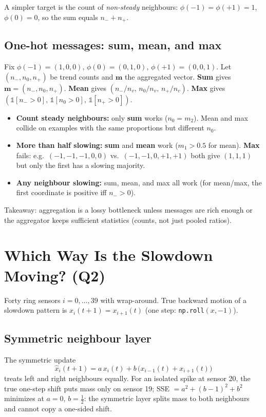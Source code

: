 A simpler target is the count of \emph{non-steady} neighbours: $\phi(-1)=\phi(+1)=1$, $\phi(0)=0$, so the sum equals $n_- + n_+$.

\subsection{One-hot messages: sum, mean, and max}

Fix $\phi(-1)=(1,0,0)$, $\phi(0)=(0,1,0)$, $\phi(+1)=(0,0,1)$.
Let $(n_-, n_0, n_+)$ be trend counts and $\mathbf{m}$ the aggregated vector.
\textbf{Sum} gives $\mathbf{m} = (n_-, n_0, n_+)$.
\textbf{Mean} gives $(n_-/n_v,\, n_0/n_v,\, n_+/n_v)$.
\textbf{Max} gives $(\mathbb{1}[n_->0],\,\mathbb{1}[n_0>0],\,\mathbb{1}[n_+>0])$.

\begin{itemize}
  \item \textbf{Count steady neighbours:} only \textbf{sum} works ($n_0 = m_2$). Mean and max collide on examples with the same proportions but different $n_0$.
  \item \textbf{More than half slowing:} \textbf{sum} and \textbf{mean} work ($m_1>0.5$ for mean). \textbf{Max} fails: e.g.\ $(-1,-1,-1,0,0)$ vs.\ $(-1,-1,0,+1,+1)$ both give $(1,1,1)$ but only the first has a slowing majority.
  \item \textbf{Any neighbour slowing:} sum, mean, and max all work (for mean/max, the first coordinate is positive iff $n_->0$).
\end{itemize}

Takeaway: aggregation is a lossy bottleneck unless messages are rich enough or the aggregator keeps sufficient statistics (counts, not just pooled ratios).

\section{Which Way Is the Slowdown Moving? (Q2)}

Forty ring sensors $i = 0,\ldots,39$ with wrap-around.
True backward motion of a slowdown pattern is $x_i(t+1) = x_{i+1}(t)$ (one step: \texttt{np.roll}$(x,-1)$).

\subsection{Symmetric neighbour layer}

The symmetric update
\[
  \hat{x}_i(t+1) = a\, x_i(t) + b\,\big(x_{i-1}(t) + x_{i+1}(t)\big)
\]
treats left and right neighbours equally.
For an isolated spike at sensor 20, the true one-step shift puts mass only on sensor 19; SSE $=a^2+(b-1)^2+b^2$ minimizes at $a=0$, $b=\tfrac{1}{2}$: the symmetric layer splits mass to both neighbours and cannot copy a one-sided shift.

